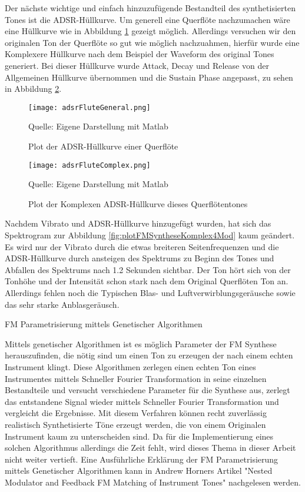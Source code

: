Der nächste wichtige und einfach hinzuzufügende Bestandteil des synthetisierten Tones ist die ADSR-Hüllkurve. Um generell eine Querflöte nachzumachen wäre eine Hüllkurve wie in Abbildung \ref{fig:adsrFluteGeneral} gezeigt möglich. Allerdings versuchen wir den originalen Ton der Querflöte so gut wie möglich nachzuahmen, hierfür wurde eine Komplexere Hüllkurve nach dem Beispiel der Waveform des original Tones generiert. Bei dieser Hüllkurve wurde Attack, Decay und Release von der Allgemeinen Hüllkurve übernommen und die Sustain Phase angepasst, zu sehen in Abbildung \ref{fig:adsrFluteComplex}. 

\begin{figure} [ht]
\centering
  \texttt{[image: adsrFluteGeneral.png]}
\caption{Plot der ADSR-Hüllkurve einer Querflöte}
\label{fig:adsrFluteGeneral}
Quelle: Eigene Darstellung mit Matlab
\end{figure}

\begin{figure} [ht]
\centering
  \texttt{[image: adsrFluteComplex.png]}
\caption{Plot der Komplexen ADSR-Hüllkurve dieses Querflötentones}
\label{fig:adsrFluteComplex}
Quelle: Eigene Darstellung mit Matlab
\end{figure}

Nachdem Vibrato und ADSR-Hüllkurve hinzugefügt wurden, hat sich das Spektrogram zur Abbildung \ref{fig:plotFMSyntheseKomplex4Mod} kaum geändert. Es wird nur der Vibrato durch die etwas breiteren Seitenfrequenzen und die ADSR-Hüllkurve durch ansteigen des Spektrums zu Beginn des Tones und Abfallen des Spektrums nach 1.2 Sekunden sichtbar. Der Ton hört sich von der Tonhöhe und der Intensität schon stark nach dem Original Querflöten Ton an. Allerdings fehlen noch die Typischen Blas- und Luftverwirblungsgeräusche sowie das sehr starke Anblasgeräusch.

\FloatBarrier

FM Parametrisierung mittels Genetischer Algorithmen

Mittels genetischer Algorithmen ist es möglich Parameter der FM Synthese herauszufinden, die nötig sind um einen Ton zu erzeugen der nach einem echten Instrument klingt. Diese Algorithmen zerlegen einen echten Ton eines Instrumentes mittels Schneller Fourier Transformation in seine einzelnen Bestandteile und versucht verschiedene Parameter für die Synthese aus, zerlegt das entstandene Signal wieder mittels Schneller Fourier Transformation und vergleicht die Ergebnisse. Mit diesem Verfahren können recht zuverlässig realistisch Synthetisierte Töne erzeugt werden, die von einem Originalen Instrument kaum zu unterscheiden sind. Da für die Implementierung eines solchen Algorithmus allerdings die Zeit fehlt, wird dieses Thema in dieser Arbeit nicht weiter vertieft. Eine Ausführliche Erklärung der FM Parametrisierung mittels Genetischer Algorithmen kann in Andrew Horners Artikel "Nested Modulator and Feedback FM Matching of Instrument Tones" nachgelesen werden.


